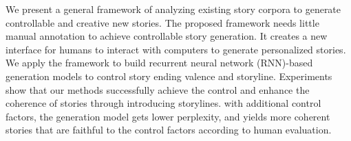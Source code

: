 We present a general framework of analyzing existing story corpora to generate controllable and creative new stories. The proposed framework needs little manual annotation to achieve controllable story generation. It creates a new interface for humans to interact with computers to generate personalized stories. We apply the framework to build recurrent neural network (RNN)-based generation models to control story ending valence and storyline. Experiments show that our methods successfully achieve the control and enhance the coherence of stories through introducing storylines. with additional control factors, the generation model gets lower perplexity, and yields more coherent stories that are faithful to the control factors according to human evaluation.
